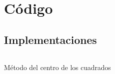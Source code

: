 \chapter{Código}

\section{Implementaciones}

\begin{listing}[H]
\inputminted[linenos, breaklines=true, numberblanklines=false, style=colorful]{bash}{../code/center-squared-method.py}
\caption{Método del centro de los cuadrados\label{square-center-method}}
\end{listing}